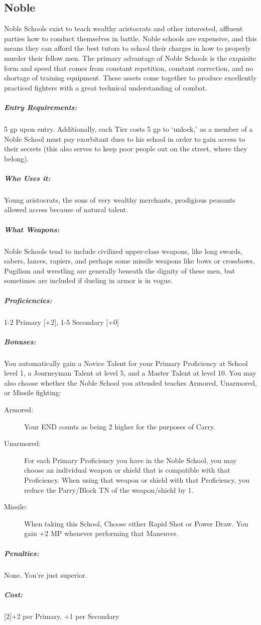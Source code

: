 \documentclass[oneside,11pt,english]{book}
\begin{document}
\subsection{Noble}
Noble Schools exist to teach wealthy aristocrats and other interested, affluent parties how to conduct 
themselves in battle. Noble schools are expensive, and this means they can afford the best tutors to school 
their charges in how to properly murder their fellow men. The primary advantage of Noble Schools is the 
exquisite form and speed that comes from constant repetition, constant correction, and no shortage of 
training equipment. These assets come together to produce excellently practiced fighters with a great 
technical understanding of combat. 

\vspace{-15pt}\subparagraph{Entry Requirements:} 5 gp upon entry. Additionally, each Tier costs 5 gp to ‘unlock,’ as a member of a Noble School must pay exorbitant dues to his school in order to gain access to their secrets (this also serves to keep poor people out on the street, where they belong).
\vspace{-15pt}\subparagraph{Who Uses it:} Young aristocrats, the sons of very wealthy merchants, prodigious peasants allowed access because of natural talent.
\vspace{-15pt}\subparagraph{What Weapons:} Noble Schools tend to include civilized upper-class weapons, like long swords, sabers, lances, rapiers, and perhaps some missile weapons like bows or crossbows. Pugilism and wrestling are generally beneath the dignity of these men, but sometimes are included if dueling in armor is in vogue.
\vspace{-15pt}\subparagraph{Proficiencies:} 1-2 Primary [+2], 1-5 Secondary [+0] 
\vspace{-15pt}\subparagraph{Bonuses:} You automatically gain a Novice Talent for your Primary Proficiency at School level 1, a Journeyman Talent at level 5, and a Master Talent at level 10. You may also choose whether the Noble School you attended teaches Armored, Unarmored, or Missile fighting:
\begin{description}
\item [Armored:] Your END counts as being 2 higher for the purposes of Carry.
\item [Unarmored:] For each Primary Proficiency you have in the Noble School, you may choose an individual weapon or shield that is compatible with that Proficiency. When using that weapon or shield with that Proficiency, you reduce the Parry/Block TN of the weapon/shield by 1.
\item [Missile:] When taking this School, Choose either Rapid Shot or Power Draw. You gain +2 MP whenever performing that Maneuver.
\end{description}
\vspace{-15pt}\subparagraph{Penalties:} None. You’re just superior. 
\vspace{-15pt}\subparagraph{Cost:}[2]+2 per Primary, +1 per Secondary
\end{document}
